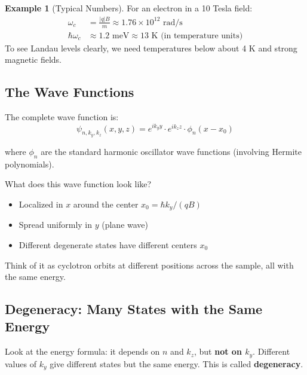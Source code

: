 \documentclass[11pt,a4paper]{article}
\let\oldsubsection\subsection
\renewcommand{\subsection}{\needspace{4\baselineskip}\oldsubsection}
\theoremstyle{definition}
\newtheorem{example}{Example}[section]
\theoremstyle{remark}
\begin{document}
\begin{example}[Typical Numbers]
For an electron in a 10 Tesla field:
\begin{align}
    \omega_c &= \frac{|q|B}{m} \approx 1.76 \times 10^{12} \text{ rad/s} \\
    \hbar\omega_c &\approx 1.2 \text{ meV} \approx 13 \text{ K (in temperature units)}
\end{align}
To see Landau levels clearly, we need temperatures below about 4 K and strong magnetic fields.
\end{example}

\subsection{The Wave Functions}

The complete wave function is:
\begin{equation}
    \psi_{n, k_y, k_z}(x, y, z) = e^{ik_y y} \cdot e^{ik_z z} \cdot \phi_n(x - x_0)
\end{equation}

where $\phi_n$ are the standard harmonic oscillator wave functions (involving Hermite polynomials).

\begin{insight}
What does this wave function look like?
\begin{itemize}
    \item Localized in $x$ around the center $x_0 = \hbar k_y/(qB)$
    \item Spread uniformly in $y$ (plane wave)
    \item Different degenerate states have different centers $x_0$
\end{itemize}
Think of it as cyclotron orbits at different positions across the sample, all with the same energy.
\end{insight}

\subsection{Degeneracy: Many States with the Same Energy}

Look at the energy formula: it depends on $n$ and $k_z$, but \textbf{not on $k_y$}. Different values of $k_y$ give different states but the same energy. This is called \textbf{degeneracy}.
\end{document}
